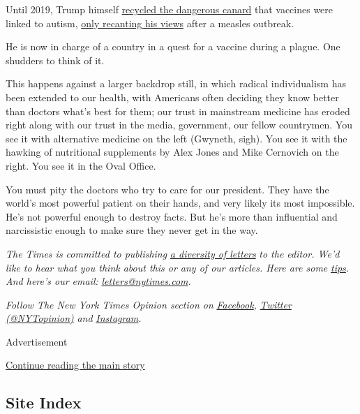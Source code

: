 Until 2019, Trump himself
\href{https://twitter.com/realDonaldTrump/status/449525268529815552}{recycled
the dangerous canard} that vaccines were linked to autism,
\href{https://www.statnews.com/2019/04/26/trump-vaccinations-measles/}{only
recanting his views} after a measles outbreak.

He is now in charge of a country in a quest for a vaccine during a
plague. One shudders to think of it.

This happens against a larger backdrop still, in which radical
individualism has been extended to our health, with Americans often
deciding they know better than doctors what's best for them; our trust
in mainstream medicine has eroded right along with our trust in the
media, government, our fellow countrymen. You see it with alternative
medicine on the left (Gwyneth, sigh). You see it with the hawking of
nutritional supplements by Alex Jones and Mike Cernovich on the right.
You see it in the Oval Office.

You must pity the doctors who try to care for our president. They have
the world's most powerful patient on their hands, and very likely its
most impossible. He's not powerful enough to destroy facts. But he's
more than influential and narcissistic enough to make sure they never
get in the way.

\emph{The Times is committed to publishing}
\href{https://www.nytimes.com/2019/01/31/opinion/letters/letters-to-editor-new-york-times-women.html}{\emph{a
diversity of letters}} \emph{to the editor. We'd like to hear what you
think about this or any of our articles. Here are some}
\href{https://help.nytimes.com/hc/en-us/articles/115014925288-How-to-submit-a-letter-to-the-editor}{\emph{tips}}\emph{.
And here's our email:}
\href{mailto:letters@nytimes.com}{\emph{letters@nytimes.com}}\emph{.}

\emph{Follow The New York Times Opinion section on}
\href{https://www.facebook.com/nytopinion}{\emph{Facebook}}\emph{,}
\href{http://twitter.com/NYTOpinion}{\emph{Twitter (@NYTopinion)}}
\emph{and}
\href{https://www.instagram.com/nytopinion/}{\emph{Instagram}}\emph{.}

Advertisement

\protect\hyperlink{after-bottom}{Continue reading the main story}

\hypertarget{site-index}{%
\subsection{Site Index}\label{site-index}}

